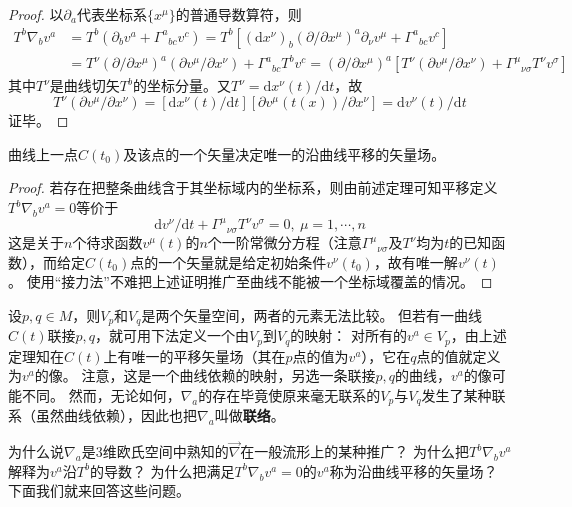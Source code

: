 \begin{proof}
以$\partial_a$代表坐标系$\{x^\mu\}$的普通导数算符，则
$$\begin{aligned}
T^b\nabla_bv^a & = T^b(\partial_bv^a + \Gamma^a{}_{bc}v^c) = T^b[(\mathrm{d}x^\nu)_b(\partial / \partial x^\mu)^a\partial_\nu v^\mu + \Gamma^a{}_{bc}v^c] \\
& = T^\nu(\partial / \partial x^\mu)^a(\partial v^\mu / \partial x^\nu) + \Gamma^a{}_{bc}T^bv^c = (\partial / \partial x^\mu)^a[T^\nu(\partial v^\mu / \partial x^\nu) + \Gamma^\mu{}_{\nu\sigma}T^\nu v^\sigma]
\end{aligned}$$
其中$T^\nu$是曲线切矢$T^b$的坐标分量。又$T^\nu = \mathrm{d}x^\nu(t) / \mathrm{d}t$，故
$$T^\nu(\partial v^\mu / \partial x^\nu) = [\mathrm{d}x^\nu(t) / \mathrm{d}t][\partial v^\mu(t(x)) / \partial x^\nu] = \mathrm{d}v^\nu(t) / \mathrm{d}t$$
证毕。
\end{proof}

\begin{theorem}
曲线上一点$C(t_0)$及该点的一个矢量决定唯一的沿曲线平移的矢量场。
\end{theorem}

\begin{proof}
若存在把整条曲线含于其坐标域内的坐标系，则由前述定理可知平移定义$T^b\nabla_bv^a = 0$等价于
$$\mathrm{d}v^\nu / \mathrm{d}t + \Gamma^\mu{}_{\nu\sigma}T^\nu v^\sigma = 0, ~ \mu = 1, \cdots, n$$
这是关于$n$个待求函数$v^\mu(t)$的$n$个一阶常微分方程（注意$\Gamma^\mu{}_{\nu\sigma}$及$T^\nu$均为$t$的已知函数），而给定$C(t_0)$点的一个矢量就是给定初始条件$v^\nu(t_0)$，故有唯一解$v^\nu(t)$。
使用``接力法''不难把上述证明推广至曲线不能被一个坐标域覆盖的情况。
\end{proof}

设$p, q \in M$，则$V_p$和$V_q$是两个矢量空间，两者的元素无法比较。
但若有一曲线$C(t)$联接$p, q$，就可用下法定义一个由$V_p$到$V_q$的映射：
对所有的$v^a \in V_p$，由上述定理知在$C(t)$上有唯一的平移矢量场（其在$p$点的值为$v^a$），它在$q$点的值就定义为$v^a$的像。
注意，这是一个曲线依赖的映射，另选一条联接$p, q$的曲线，$v^a$的像可能不同。
然而，无论如何，$\nabla_a$的存在毕竟使原来毫无联系的$V_p$与$V_q$发生了某种联系（虽然曲线依赖），因此也把$\nabla_a$叫做\textbf{联络}。

为什么说$\nabla_a$是$3$维欧氏空间中熟知的$\vec{\nabla}$在一般流形上的某种推广？
为什么把$T^b\nabla_bv^a$解释为$v^a$沿$T^b$的导数？
为什么把满足$T^b\nabla_bv^a = 0$的$v^a$称为沿曲线平移的矢量场？
下面我们就来回答这些问题。

